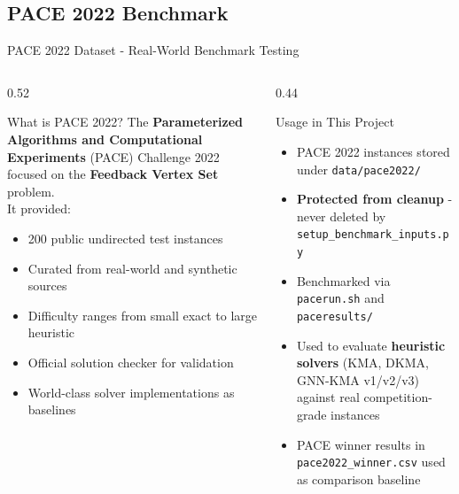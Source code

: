 \documentclass[aspectratio=169]{beamer}
\begin{document}
\subsection{PACE 2022 Benchmark}

\begin{frame}{PACE 2022 Dataset - Real-World Benchmark Testing}
	\tiny
	\begin{columns}[T]
		\begin{column}{0.52\textwidth}
			\begin{block}{What is PACE 2022?}
				The \textbf{Parameterized Algorithms and Computational Experiments}
				(PACE) Challenge 2022 \cite{pace2022} focused on the
				\textbf{Feedback Vertex Set} problem.\\[5pt]
				It provided:
				\begin{itemize}
					\item 200 public undirected test instances
					\item Curated from real-world and synthetic sources
					\item Difficulty ranges from small exact to large heuristic
					\item Official solution checker for validation
					\item World-class solver implementations as baselines
				\end{itemize}
			\end{block}
		\end{column}
		\begin{column}{0.44\textwidth}
			\begin{block}{Usage in This Project}
				\begin{itemize}\setlength\itemsep{3pt}
					\item PACE 2022 instances stored under
					      \texttt{data/pace2022/}
					\item \textbf{Protected from cleanup} - never deleted
					      by \texttt{setup\_benchmark\_inputs.py}
					\item Benchmarked via \texttt{pacerun.sh}
					      and \texttt{paceresults/}
					\item Used to evaluate \textbf{heuristic solvers}
					      (KMA, DKMA, GNN-KMA v1/v2/v3)
					      against real competition-grade instances
					\item PACE winner results in \texttt{pace2022\_winner.csv}
					      used as comparison baseline

\end{itemize}
\end{block}
\end{column}
\end{columns}
\end{frame}
\end{document}
